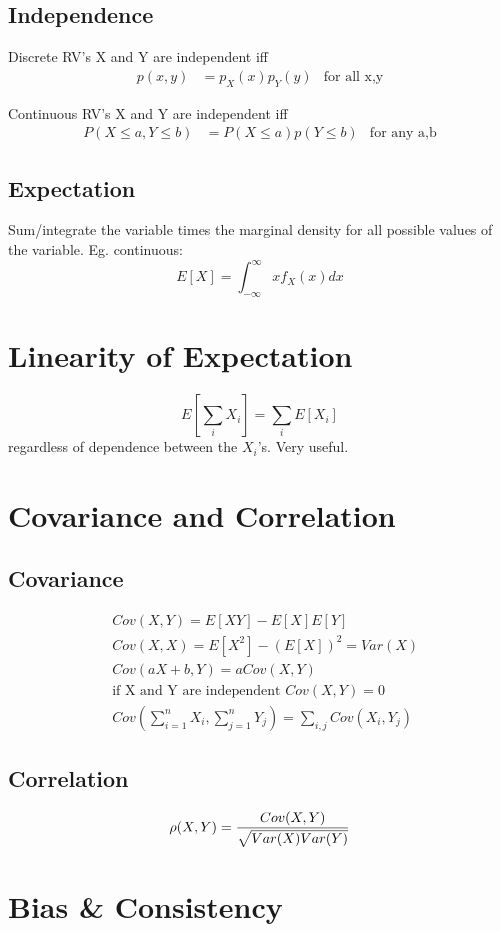 \documentclass[12pt]{amsart}
\begin{document}
\subsection{Independence}
Discrete RV's X and Y are independent iff
\begin{align*}
p(x,y) &= p_X(x)p_Y(y) & \text{for all x,y}
\end{align*}

Continuous RV's X and Y are independent iff
\begin{align*}
P(X \leq a, Y \leq b) &= P(X\leq a)p(Y \leq b) & \text{for any a,b}
\end{align*}

\subsection{Expectation}
Sum/integrate the variable times the marginal density for all possible values of the variable. Eg. continuous:
\[
E[X] = \int_{-\infty}^{\infty} xf_X(x) dx
\]
\section{Linearity of Expectation}
\[
E\left[\sum_i X_i\right] = \sum_i E[X_i]
\]
regardless of dependence between the $X_i$'s. Very useful.
\section{Covariance and Correlation}
\subsection{Covariance}
\begin{align*}
&Cov(X,Y) = E[XY] - E[X]E[Y] \\
&Cov(X,X) = E[X^2] - (E[X])^2 = Var(X) \\
&Cov(aX+b, Y) = a Cov(X,Y)\\
&\text{if X and Y are independent } Cov(X,Y)=0 \\
&Cov \left(\sum_{i=1}^n X_i, \sum_{j=1}^n Y_j\right) = \sum_{i,j} Cov(X_i, Y_j)
\end{align*}
%
\subsection{Correlation}
\[
\rho(X,Y) = {Cov(X,Y) \over \sqrt{Var(X) Var(Y)}}
\]
%
\section{Bias \& Consistency}
\end{document}
